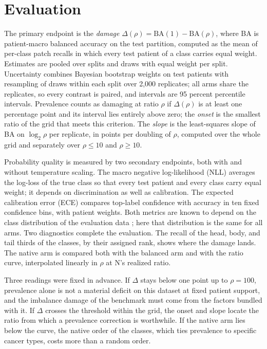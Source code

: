 \documentclass[11pt]{article}
\begin{document}
\section{Evaluation}
\label{sec:evaluation}
The primary endpoint is the \emph{damage} $\Delta(\rho)=\mathrm{BA}(1)-\mathrm{BA}(\rho)$, where BA is patient-macro balanced accuracy on the test partition, computed as the mean of per-class patch recalls in which every test patient of a class carries equal weight. Estimates are pooled over splits and draws with equal weight per split. Uncertainty combines Bayesian bootstrap weights on test patients \citep{rubin1981bayesian} with resampling of draws within each split over 2,000 replicates; all arms share the replicates, so every contrast is paired, and intervals are 95 percent percentile intervals. Prevalence counts as damaging at ratio $\rho$ if $\Delta(\rho)$ is at least one percentage point and its interval lies entirely above zero; the \emph{onset} is the smallest ratio of the grid that meets this criterion. The \emph{slope} is the least-squares slope of BA on $\log_2\rho$ per replicate, in points per doubling of $\rho$, computed over the whole grid and separately over $\rho\leq10$ and $\rho\geq10$.

Probability quality is measured by two secondary endpoints, both with and without temperature scaling. The macro negative log-likelihood (NLL) averages the log-loss of the true class so that every test patient and every class carry equal weight; it depends on discrimination as well as calibration. The expected calibration error (ECE) compares top-label confidence with accuracy in ten fixed confidence bins, with patient weights. Both metrics are known to depend on the class distribution of the evaluation data \citep{mosquera2024classImbalance}; here that distribution is the same for all arms. Two diagnostics complete the evaluation. The recall of the head, body, and tail thirds of the classes, by their assigned rank, shows where the damage lands. The native arm is compared both with the balanced arm and with the ratio curve, interpolated linearly in $\rho$ at N's realized ratio.

Three readings were fixed in advance. If $\Delta$ stays below one point up to $\rho=100$, prevalence alone is not a material deficit on this dataset at fixed patient support, and the imbalance damage of the benchmark must come from the factors bundled with it. If $\Delta$ crosses the threshold within the grid, the onset and slope locate the ratio from which a prevalence correction is worthwhile. If the native arm lies below the curve, the native order of the classes, which ties prevalence to specific cancer types, costs more than a random order.





\end{document}
